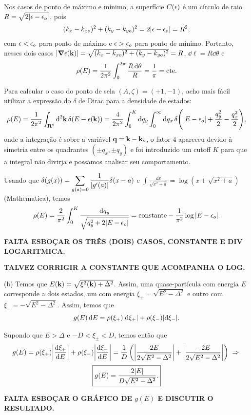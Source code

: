 \documentclass[a4paper,10pt]{article}
\begin{document}
Nos casos de ponto de máximo e mínimo, a superfície $C(\epsilon)$ é um círculo de raio $R = \sqrt{2\abs{\epsilon-\epsilon_o}}$, pois
$$
(k_x - k_{xo})^2 + (k_y - k_{yo})^2 = 2 \abs{\epsilon - \epsilon_o} = R^2,
$$
com $\epsilon < \epsilon_o$ para ponto de máximo e $\epsilon > \epsilon_o$ para ponto de mínimo. Portanto, nesses dois casos $\abs{\grad{\epsilon(\vb{k})}} = \sqrt{(k_x - k_{xo})^2 + (k_y - k_{yo})^2} = R$, $\dd{\ell} = R \dd{\theta}$ e
$$
\rho(E) = \frac{1}{2\pi^2} \int_0^{2\pi} \frac{R \dd{\theta}}{R} = \frac{1}{\pi} = \text{cte}.
$$

Para calcular o caso do ponto de sela $(A, \zeta) = (+1, -1)$, acho mais fácil utilizar a expressão do $\delta$ de Dirac para a densidade de estados:
$$
\rho(E) = \frac{1}{2\pi^2} \int_{\vb{R}^2} \dd[2]{\vb{k}} \delta(E - \epsilon(\vb{k})) =
\frac{4}{2 \pi^2} \int_0^K \dd{q_y} \int_0^\infty \dd{q_x}
\delta\qty(\abs{E - \epsilon_o} + \frac{q_y^2}{2} - \frac{q_x^2}{2}),
$$
onde a integração é sobre a variável $\vb{q} = \vb{k} - \vb{k}_o$, o fator $4$ apareceu devido à simetria entre os quadrantes $(\pm q_x, \pm q_y)$ e foi introduzido um cutoff $K$ para que a integral não divirja e possamos analisar seu comportamento.

Usando que $\displaystyle{\delta(g(x)) = \sum_{g(a)=0} \frac{1}{\abs{g'(a)}} \delta(x-a)}$ e $\displaystyle{\int \frac{\dd{x}}{\sqrt{x^2+a}} = \log(x + \sqrt{x^2 + a})}$ (Mathematica), temos
$$
\rho(E) = \frac{2}{\pi^2} \int_0^K \frac{\dd{q_y}}{\sqrt{q_y^2 + 2 \abs{E-\epsilon_o}}} =
\text{constante} - \frac{1}{\pi^2} \log\abs{E-\epsilon_o}.
$$

\textbf{FALTA ESBOÇAR OS TRÊS (DOIS) CASOS, CONSTANTE E DIV LOGARITMICA.}

\textbf{TALVEZ CORRIGIR A CONSTANTE QUE ACOMPANHA O LOG.}

\n

(b) Temos que $E(\vb{k}) = \sqrt{\xi^2(\vb{k}) + \Delta^2}$. Assim, uma quase-partícula com energia $E$ corresponde a dois estados, um com energia $\xi_+ = \sqrt{E^2 - \Delta^2}$ e outro com $\xi_- = -\sqrt{E^2 - \Delta^2}$. Assim, temos que
$$
g(E) \dd{E} = \rho(\xi_+) \abs{\dd{\xi_+}} + \rho(\xi_-) \abs{\dd{\xi_-}}.
$$

Supondo que $E > \Delta$ e $-D < \xi_\pm < D$, temos então que
$$
g(E) = \rho(\xi_+) \abs{\dv{\xi_+}{E}} + \rho(\xi_-) \abs{\dv{\xi_-}{E}} =
\frac{1}{D} \, \qty(\abs{\frac{2E}{2\sqrt{E^2-\Delta^2}}} + \abs{\frac{-2E}{2\sqrt{E^2-\Delta^2}}}) \; \Rightarrow \;
$$
$$
\boxed{ g(E) = \frac{2 \abs{E}}{D \sqrt{E^2 - \Delta^2}}. }
$$

\textbf{FALTA ESBOÇAR O GRÁFICO DE $g(E)$ E DISCUTIR O RESULTADO.}
\end{document}
